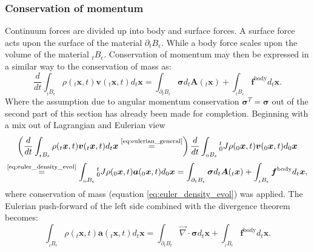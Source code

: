 \documentclass[m,times]{cgMA}
\begin{document}
\subsubsection{Conservation of momentum}
Continuum forces are divided up into body and surface forces. A surface force acts upon the surface of the material $\partial _tB_\epsilon$. While a body force scales upon the volume of the material $_tB_\epsilon$. Conservation of momentum may then be expressed in a similar way to the conservation of mass as:
\begin{equation}
  \frac { d } { d t } \int _ {_tB _ { \epsilon}  } \rho ( _t\boldsymbol{x} , t ) \boldsymbol{v} ( _t\boldsymbol{x} , t ) d _t\boldsymbol{x} = \int _ { \partial _tB _ {\epsilon  } } \boldsymbol{\sigma} d_t\boldsymbol{A} (_t\boldsymbol{x} ) + \int _ { _tB_\epsilon } \boldsymbol{f} ^ {\text{body} } d _t\boldsymbol{x}.
\end{equation}
Where the assumption due to angular momentum conservation $\boldsymbol{\sigma}^T  = \boldsymbol{\sigma} $ out of the second part of this section has already been made for completion. Beginning with a mix out of Lagrangian and Eulerian view
$$\left(\frac { d } { d t } \int _ {_tB _ { \epsilon}  } \rho ( _t\boldsymbol{x} , t ) \boldsymbol{v} ( _t\boldsymbol{x} , t ) d _t\boldsymbol{x} \stackrel{\text{\ref{eq:eulerian_general}}}{=} \right)
\frac { d } { d t } \int _ {_0B _ { \epsilon}  } {^t_0J} \rho ( _0\boldsymbol{x} , t ) \boldsymbol{v} ( _0\boldsymbol{x} , t ) d _0\boldsymbol{x}$$
\begin{equation}
  \stackrel{\text{\ref{eq:euler_density_evol}}}{=}
  \int _ {_0B _ { \epsilon}  } {^t_0J} \rho ( _0\boldsymbol{x} , t ) \boldsymbol{a} ( _0\boldsymbol{x} , t ) d _0\boldsymbol{x}
  = \int _ { \partial _tB _ {\epsilon  } } \boldsymbol{\sigma} d_t\boldsymbol{A} (_t\boldsymbol{x} ) + \int _ { _tB_\epsilon } \boldsymbol{f} ^ {\text{body} } d _t\boldsymbol{x},
\end{equation}
where conservation of mass (equation \ref{eq:euler_density_evol}) was applied.
The Eulerian push-forward of the left side combined with the divergence theorem becomes:
\begin{equation}\label{eq:eul_transport}
  \int _ {_tB _ { \epsilon}  } \rho ( _t\boldsymbol{x} , t ) \boldsymbol{a} ( _t\boldsymbol{x} , t ) d _t\boldsymbol{x} =
  \int _ { \partial _tB _ {\epsilon } } \vec{\nabla} \cdot \boldsymbol{\sigma} d_t\boldsymbol{x}  + \int _ { _tB_\epsilon } \boldsymbol{f} ^ {\text{body} } d _t\boldsymbol{x}.
\end{equation}
\end{document}
